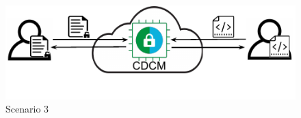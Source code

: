 \begin{figure}[htbp]
\centerline{\includegraphics[scale=0.72]{figures/fg-scenario-3.pdf}}
\caption{Scenario 3}\label{fg-scenario_3}
\end{figure}